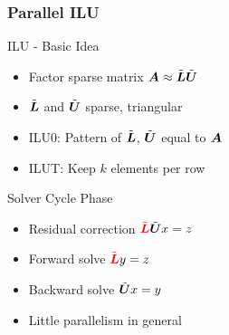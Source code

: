 \begin{frame}[fragile]
\frametitle{Parallel ILU}

  \begin{minipage}{0.5\textwidth}
    \begin{block}{ILU - Basic Idea}
      \begin{itemize}
        \item Factor sparse matrix $\boldsymbol{A} \approx \tilde{\boldsymbol{L}} \tilde{\boldsymbol{U}}$
        \item $\tilde{\boldsymbol{L}}$ and $\tilde{\boldsymbol{U}}$ sparse, triangular
        \item ILU0: Pattern of $\tilde{\boldsymbol{L}}$, $\tilde{\boldsymbol{U}}$ equal to $\boldsymbol{A}$
        \item ILUT: Keep $k$ elements per row
      \end{itemize}
    \end{block}
  \end{minipage}
%
  \begin{minipage}{0.45\textwidth}
    \begin{block}{Solver Cycle Phase}
      \vspace*{-0.1cm}
      \begin{itemize}
        \item Residual correction ${\color{red}\tilde{\matrix L}} \tilde{\matrix U} x = z$
        \item Forward solve ${\color{red}\tilde{\matrix L}} y = z$
        \item Backward solve $\tilde{\boldsymbol{U}} x = y$
        \item Little parallelism in general
      \end{itemize}
    \end{block}
  \end{minipage}



\end{frame}
